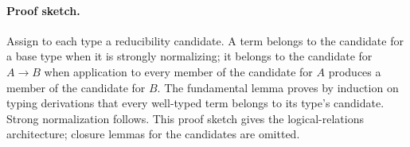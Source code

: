 \paragraph{Proof sketch.}
Assign to each type a reducibility candidate.  A term belongs to the candidate
for a base type when it is strongly normalizing; it belongs to the candidate
for \(A\to B\) when application to every member of the candidate for \(A\)
produces a member of the candidate for \(B\).  The fundamental lemma proves by
induction on typing derivations that every well-typed term belongs to its
type's candidate.  Strong normalization follows.  This proof sketch gives the
logical-relations architecture; closure lemmas for the candidates are omitted.


